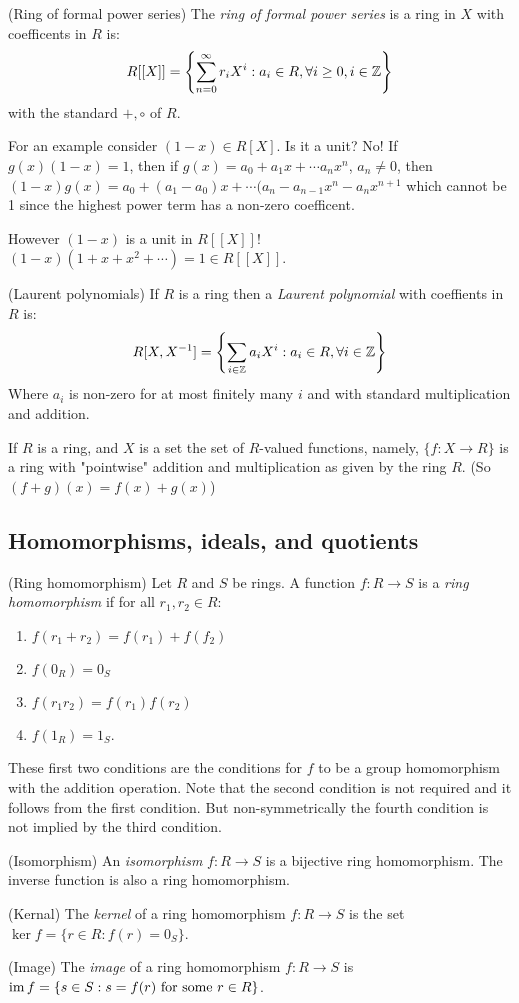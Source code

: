 \documentclass{article}
\begin{document}
\begin{definition}
	(Ring of formal power series) The \textit{ring of formal power series} is a ring in $ X $ with coefficents in $ R $ is:
	\[
	R[[X]]=\left\{\sum_{n=0}^\infty r_iX^i:a_i\in R,\forall i\ge 0, i\in\mathbb{Z}\right\}
	\]
	with the standard $ +,\circ $ of $ R $.
\end{definition}
For an example consider $ (1-x)\in R[X] $. Is it a unit? No! If $ g(x)(1-x)=1 $, then if $ g(x)=a_0+a_1x+\cdots a_nx^n $, $ a_n\ne 0 $, then $ (1-x)g(x) = a_0 + (a_1-a_0)x+\cdots (a_n-a_{n-1}x^n-a_nx^{n+1} $ which cannot be 1 since the highest power term has a non-zero coefficent.\par
However $ (1-x) $ is a unit in $ R[[X]] $! $ (1-x)(1+x+x^2+\cdots)=1\in R[[X]] $.\par
\begin{definition}
	(Laurent polynomials) If $ R $ is a ring then a \textit{Laurent polynomial} with coeffients in $ R $ is:
	\[
		R[X,{X}^{-1}] = \left\{\sum_{i\in\mathbb{Z}}a_iX^i: a_i\in R,\forall i\in\mathbb{Z}\right\}
	\]
	Where $ a_i $ is non-zero for at most finitely many $ i $ and with standard multiplication and addition.
\end{definition}

If $ R $ is a ring, and $ X $ is a set the set of $ R $-valued functions, namely, $ \{f:X\to R\} $ is a ring with "pointwise" addition and multiplication as given by the ring $ R $. (So $ (f+g)(x)=f(x)+g(x) $)
\subsection{Homomorphisms, ideals, and quotients}
\begin{definition}
	(Ring homomorphism) Let $ R $ and $ S $ be rings. A function $ f:R\to S $ is a \textit{ring homomorphism} if for all $ r_1,r_2\in R $:
	\begin{enumerate}
		\item $ f(r_1+r_2)=f(r_1)+f(f_2) $
		\item $ f(0_R)=0_S $
		\item $ f(r_1r_2)=f(r_1)f(r_2) $
		\item $ f(1_R)=1_S $.
	\end{enumerate}
\end{definition}
These first two conditions are the conditions for $ f $ to be a group homomorphism with the addition operation. Note that the second condition is not required and it follows from the first condition. But non-symmetrically the fourth condition is not implied by the third condition.
\begin{definition}
	(Isomorphism) An \textit{isomorphism} $ f:R\to S $ is a bijective ring homomorphism. The inverse function is also a ring homomorphism.
\end{definition}
\begin{definition}
	(Kernal) The \textit{kernel} of a ring homomorphism $ f: R\to S $ is the set $ \ker f = \{r\in R: f(r)=0_S\} $.
\end{definition}
\begin{definition}
	(Image) The \textit{image} of a ring homomorphism $ f: R\to S $ is $ \operatorname{im} f = \{s\in S:s=f(r) \text{ for some } r\in R \}$.
\end{definition}
\end{document}
